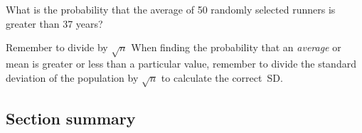 \begin{exercisewrap}
\begin{nexercise}
What is the probability that the average of 50 randomly selected runners is greater than 37 years?\footnotemark
\end{nexercise}
\end{exercisewrap}

\begin{onebox}{Remember to divide by $\sqrt{n}$}
When finding the probability that an \emph{average} or mean is greater or less than a particular value, remember to divide the standard deviation of the population by $\sqrt{n}$ to calculate the correct~SD.\end{onebox}

\subsection*{Section summary}

